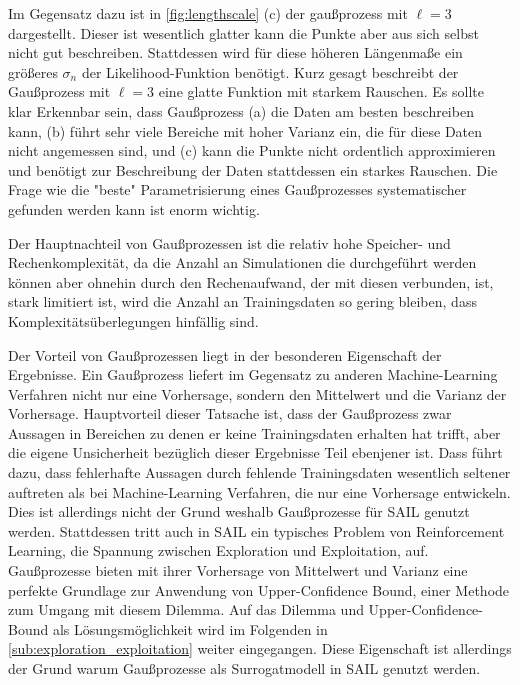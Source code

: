 Im Gegensatz dazu ist in \cref{fig:lengthscale} (c) der gaußprozess mit $\ell = 3$ dargestellt. Dieser ist wesentlich glatter kann die Punkte aber aus sich selbst nicht gut beschreiben. 
Stattdessen wird für diese höheren Längenmaße ein größeres $\sigma_n$ der Likelihood-Funktion benötigt. 
Kurz gesagt beschreibt der Gaußprozess mit $\ell=3$ eine glatte Funktion mit starkem Rauschen.
Es sollte klar Erkennbar sein, dass Gaußprozess (a) die Daten am besten beschreiben kann, (b) führt sehr viele Bereiche mit hoher Varianz ein, die für diese Daten nicht angemessen sind, und (c) kann die Punkte nicht ordentlich approximieren und benötigt zur Beschreibung der Daten stattdessen ein starkes Rauschen.
Die Frage wie die "beste" Parametrisierung eines Gaußprozesses systematischer gefunden werden kann ist enorm wichtig.


Der Hauptnachteil von Gaußprozessen ist die relativ hohe Speicher- und Rechenkomplexität, da die Anzahl an Simulationen die durchgeführt werden können aber ohnehin durch den Rechenaufwand, der mit diesen verbunden, ist, stark limitiert ist, wird die Anzahl an Trainingsdaten so gering bleiben, dass Komplexitätsüberlegungen hinfällig sind.

Der Vorteil von Gaußprozessen liegt in der besonderen Eigenschaft der Ergebnisse.
Ein Gaußprozess liefert im Gegensatz zu anderen Machine-Learning Verfahren nicht nur eine Vorhersage, sondern den Mittelwert und die Varianz der Vorhersage.
Hauptvorteil dieser Tatsache ist, dass der Gaußprozess zwar Aussagen in Bereichen zu denen er keine Trainingsdaten erhalten hat trifft, aber die eigene Unsicherheit bezüglich dieser Ergebnisse Teil ebenjener ist.
Dass führt dazu, dass fehlerhafte Aussagen durch fehlende Trainingsdaten wesentlich seltener auftreten als bei Machine-Learning Verfahren, die nur eine Vorhersage entwickeln.
Dies ist allerdings nicht der Grund weshalb Gaußprozesse für SAIL genutzt werden.
Stattdessen tritt auch in SAIL ein typisches Problem von Reinforcement Learning, die Spannung zwischen Exploration und Exploitation, auf.
Gaußprozesse bieten mit ihrer Vorhersage von Mittelwert und Varianz eine perfekte Grundlage zur Anwendung von Upper-Confidence Bound, einer Methode zum Umgang mit diesem Dilemma.
Auf das Dilemma und Upper-Confidence-Bound als Lösungsmöglichkeit wird im Folgenden in \ref{sub:exploration_exploitation} weiter eingegangen.
Diese Eigenschaft ist allerdings der Grund warum Gaußprozesse als Surrogatmodell in SAIL genutzt werden.

